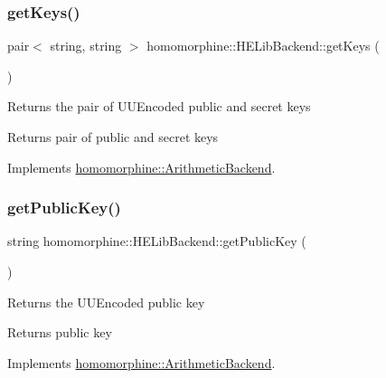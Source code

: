 \subsubsection{\texorpdfstring{get\+Keys()}{getKeys()}}
{\footnotesize\ttfamily pair$<$ string, string $>$ homomorphine\+::\+H\+E\+Lib\+Backend\+::get\+Keys (\begin{DoxyParamCaption}{ }\end{DoxyParamCaption})\hspace{0.3cm}{\ttfamily [virtual]}}

Returns the pair of U\+U\+Encoded public and secret keys

\begin{DoxyReturn}{Returns}
pair of public and secret keys 
\end{DoxyReturn}


Implements \hyperlink{classhomomorphine_1_1_arithmetic_backend_a71bb86054685708001c636e3085d578c}{homomorphine\+::\+Arithmetic\+Backend}.

\mbox{\label{classhomomorphine_1_1_h_e_lib_backend_a8b096d4780f3b65f0fa0cb3ca6cb9ab8}} 
\subsubsection{\texorpdfstring{get\+Public\+Key()}{getPublicKey()}}
{\footnotesize\ttfamily string homomorphine\+::\+H\+E\+Lib\+Backend\+::get\+Public\+Key (\begin{DoxyParamCaption}{ }\end{DoxyParamCaption})\hspace{0.3cm}{\ttfamily [virtual]}}

Returns the U\+U\+Encoded public key

\begin{DoxyReturn}{Returns}
public key 
\end{DoxyReturn}


Implements \hyperlink{classhomomorphine_1_1_arithmetic_backend_a26f31fc0c76cf58636972f68142b9a06}{homomorphine\+::\+Arithmetic\+Backend}.

\mbox{\label{classhomomorphine_1_1_h_e_lib_backend_a57af39a901a44fef6aad76503739fde4}} 
